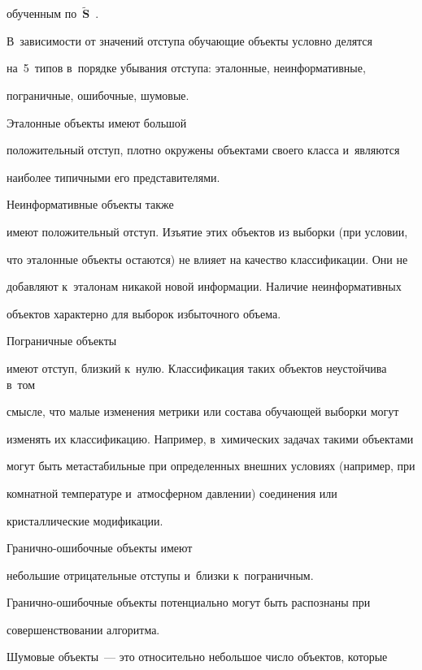 обученным по~$\tilde{\mathbf{S}}$~\cite{9-o}.

  

  В~зависимости от значений отступа обучающие объекты условно делятся 

  на~5~типов в~порядке убывания отступа: эталонные, неинформативные, 

пограничные, ошибочные, шумовые. 



Эталонные объекты имеют большой 

положительный отступ, плотно окружены объектами своего класса и~являются 

наиболее типичными его представителями. 



Неинформативные объекты также 

имеют положительный отступ. Изъятие этих объектов из выборки (при условии, 

что эталонные объекты остаются) не влияет на качество классификации. Они не 

добавляют к~эталонам никакой новой информации. Наличие неинформативных 

объектов характерно для выборок избыточного объема. 



Пограничные объекты 

имеют отступ, близкий к~нулю. Классификация таких объектов неустойчива в~том 

смысле, что малые изменения метрики или состава обучающей выборки могут 

изменять их классификацию. Например, в~химических задачах такими объектами 

могут быть метастабильные при определенных внешних условиях (например, при 

комнатной температуре и~атмосферном давлении) соединения или 

кристаллические модификации. 



Гра\-нич\-но-оши\-боч\-ные объекты имеют 

небольшие отрицательные отступы и~близки к~пограничным.  

Гра\-нич\-но-оши\-боч\-ные объекты потенциально могут быть распознаны при 

совершенствовании алгоритма.

  

  Шумовые объекты~--- это относительно небольшое число объектов, которые 


